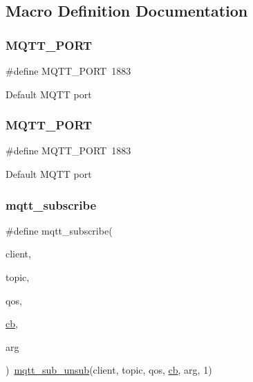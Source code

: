 \subsection{Macro Definition Documentation}
\mbox{\label{group__mqtt_gaa8632baff6bbb5004385998918f1e6bd}} 
\subsubsection{\texorpdfstring{M\+Q\+T\+T\+\_\+\+P\+O\+RT}{MQTT\_PORT}\hspace{0.1cm}{\footnotesize\ttfamily [1/2]}}
{\footnotesize\ttfamily \#define M\+Q\+T\+T\+\_\+\+P\+O\+RT~1883}

Default M\+Q\+TT port \mbox{\label{group__mqtt_gaa8632baff6bbb5004385998918f1e6bd}} 
\subsubsection{\texorpdfstring{M\+Q\+T\+T\+\_\+\+P\+O\+RT}{MQTT\_PORT}\hspace{0.1cm}{\footnotesize\ttfamily [2/2]}}
{\footnotesize\ttfamily \#define M\+Q\+T\+T\+\_\+\+P\+O\+RT~1883}

Default M\+Q\+TT port \mbox{\label{group__mqtt_ga83d6a6d811b201a74d793bc1b5d4e029}} 
\subsubsection{\texorpdfstring{mqtt\+\_\+subscribe}{mqtt\_subscribe}\hspace{0.1cm}{\footnotesize\ttfamily [1/2]}}
{\footnotesize\ttfamily \#define mqtt\+\_\+subscribe(\begin{DoxyParamCaption}\item[{}]{client,  }\item[{}]{topic,  }\item[{}]{qos,  }\item[{}]{\hyperlink{periph__rtt_2main_8c_afd4145001d494db2ea612e1239724148}{cb},  }\item[{}]{arg }\end{DoxyParamCaption})~\hyperlink{openmote-cc2538_2lwip_2src_2include_2lwip_2apps_2mqtt_8h_afdb39d4a9758f98c02451aaa9a9b3103}{mqtt\+\_\+sub\+\_\+unsub}(client, topic, qos, \hyperlink{periph__rtt_2main_8c_afd4145001d494db2ea612e1239724148}{cb}, arg, 1)}

